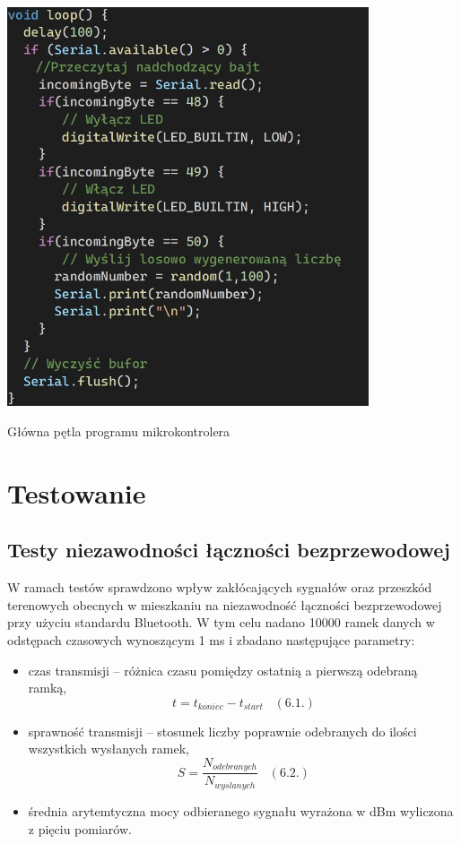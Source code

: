 \documentclass[12pt, twoside, openany]{mwrep}
\begin{document}
\begin{algorithm}[H]
\centering
\includegraphics[width=0.8\textwidth]{kod_node}
\caption{Główna pętla programu mikrokontrolera}
\end{algorithm}

\chapter{Testowanie}

\section{Testy niezawodności łączności bezprzewodowej}
W ramach testów sprawdzono wpływ zakłócających sygnałów oraz przeszkód terenowych obecnych w mieszkaniu na niezawodność łączności bezprzewodowej przy użyciu standardu Bluetooth. W tym celu nadano 10000 ramek danych w odstępach czasowych wynoszącym 1 ms i zbadano następujące parametry:

\begin{itemize}
\item czas transmisji – różnica czasu pomiędzy ostatnią a pierwszą odebraną ramką, \[ t = t_{koniec} - t_{start} \; \; \;  (6.1.)\]
\item	sprawność transmisji – stosunek liczby poprawnie odebranych do ilości wszystkich wysłanych ramek, \[ S = \frac{N_{odebranych}}{N_{wyslanych}} \; \; \;  (6.2.)\]
\item	średnia arytemtyczna mocy odbieranego sygnału wyrażona w dBm wyliczona z pięciu pomiarów.
\end{itemize}
\end{document}
